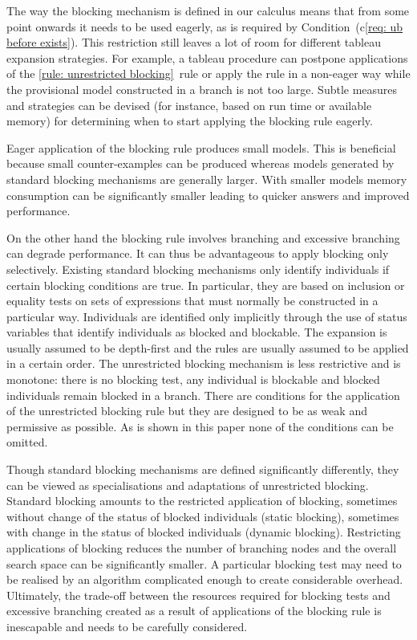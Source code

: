 \documentclass[leqno
,pdflatex
,prodmode
,acmtocl
]{acmsmall}
\begin{document}
The way the blocking mechanism is defined in our calculus means
that from some point onwards it needs to be used eagerly, as is required
by Condition~(c\ref{req: ub before exists}).
This restriction still leaves a lot of room for different
tableau expansion strategies.
For example, a tableau procedure can postpone applications of the
\eqref{rule: unrestricted blocking}~rule or apply the rule in a
non-eager way while the provisional model constructed in a branch is not
too large.
Subtle measures and strategies can be devised (for instance, based
on run time or available memory) for determining when to start
applying the blocking rule eagerly.

Eager application of the blocking rule produces small models.
This is beneficial because small counter-examples can be produced
whereas models generated by standard blocking mechanisms are generally
larger.
With smaller models memory consumption
can be significantly smaller leading to quicker answers and improved
performance.

On the other hand the blocking rule involves branching and excessive
branching can degrade performance.
It can thus be advantageous to apply blocking only selectively.
Existing standard blocking mechanisms only identify individuals if
certain blocking conditions are true.
In particular, they are based on inclusion or equality tests on
sets of expressions that must normally be constructed in a particular
way. Individuals are identified only implicitly through the use
of status variables that identify individuals as blocked and blockable.
The expansion is usually assumed to be depth-first and the rules are
usually assumed to be applied in a certain order.
The unrestricted blocking mechanism is less restrictive and is monotone:
there is no blocking test, any individual is
blockable and blocked individuals remain blocked in a branch.
There are conditions for the application of the unrestricted
blocking rule but they are designed to be as weak and permissive
as possible.
As is shown in this paper none of the conditions can be omitted. 

Though standard blocking mechanisms are defined significantly
differently, they can be viewed as specialisations and adaptations of
unrestricted blocking.
Standard blocking amounts to the restricted application of blocking,
sometimes without change of the status of blocked individuals
(static blocking), sometimes with
change in the status of blocked individuals (dynamic
blocking).
Restricting applications of blocking reduces the number of branching
nodes and the overall search space can be significantly smaller.
A particular blocking test may need to be realised by an algorithm
complicated enough to create considerable overhead.
Ultimately, the trade-off between the resources required for blocking
tests and excessive branching created as a result of applications of
the blocking rule is inescapable and needs to be carefully
considered.
\end{document}
